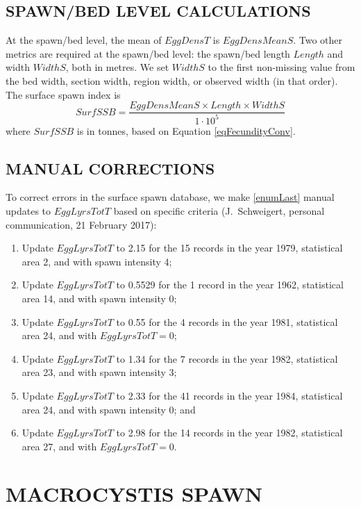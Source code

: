 \documentclass[12pt]{article}
\begin{document}
\subsection{SPAWN/BED LEVEL CALCULATIONS}

At the spawn/bed level, the mean of $EggDensT$ is $EggDensMeanS$.
Two other metrics are required at the spawn/bed level: the spawn/bed length $Length$ and width $WidthS$, both in metres.
We set $WidthS$ to the first non-missing value from the bed width, section width, region width, or observed width (in that order).
The surface spawn index is
\begin{equation}
SurfSSB = \frac{EggDensMeanS \times Length \times WidthS} {1 \cdot 10^{5}}
\label{eqBiomassSurf}
\end{equation}
where $SurfSSB$ is in tonnes, based on Equation \ref{eqFecundityConv}.

\subsection{MANUAL CORRECTIONS}

To correct errors in the surface spawn database, we make \ref{enumLast} manual updates to $EggLyrsTotT$ based on specific criteria (J.~Schweigert, personal communication, 21 February 2017):
\begin{enumerate}
\item Update $EggLyrsTotT$ to 2.15 for the 15 records in the year 1979, statistical area 2, and with spawn intensity 4;
\item Update $EggLyrsTotT$ to 0.5529 for the 1 record in the year 1962, statistical area 14, and with spawn intensity 0;
\item Update $EggLyrsTotT$ to 0.55 for the 4 records in the year 1981, statistical area 24, and with $EggLyrsTotT = 0$;
\item Update $EggLyrsTotT$ to 1.34 for the 7 records in the year 1982, statistical area 23, and with spawn intensity 3;
\item Update $EggLyrsTotT$ to 2.33 for the 41 records in the year 1984, statistical area 24, and with spawn intensity 0; and
\item Update $EggLyrsTotT$ to 2.98 for the 14 records in the year 1982, statistical area 27, and with $EggLyrsTotT = 0$. \label{enumLast}
\end{enumerate}

\section{MACROCYSTIS SPAWN}
\end{document}
